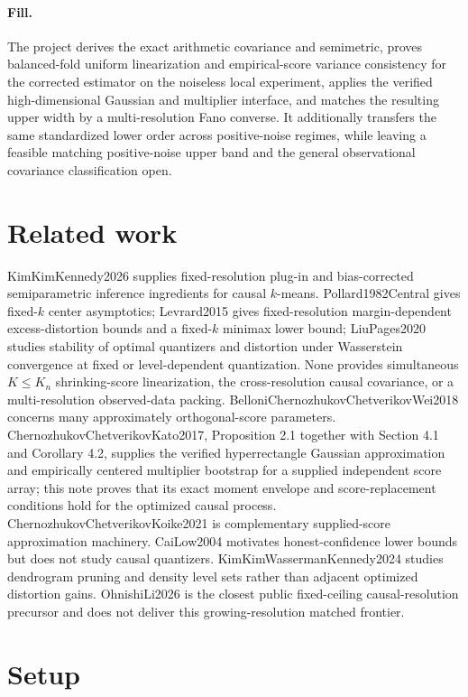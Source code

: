 \documentclass{article}
\begin{document}
\paragraph{Fill.} The project derives the exact arithmetic covariance and semimetric, proves balanced-fold uniform linearization and empirical-score variance consistency for the corrected estimator on the noiseless local experiment, applies the verified high-dimensional Gaussian and multiplier interface, and matches the resulting upper width by a multi-resolution Fano converse. It additionally transfers the same standardized lower order across positive-noise regimes, while leaving a feasible matching positive-noise upper band and the general observational covariance classification open.

\section{Related work}

KimKimKennedy2026 supplies fixed-resolution plug-in and bias-corrected semiparametric inference ingredients for causal \(k\)-means. Pollard1982Central gives fixed-\(k\) center asymptotics; Levrard2015 gives fixed-resolution margin-dependent excess-distortion bounds and a fixed-\(k\) minimax lower bound; LiuPages2020 studies stability of optimal quantizers and distortion under Wasserstein convergence at fixed or level-dependent quantization. None provides simultaneous \(K\leq K_n\) shrinking-score linearization, the cross-resolution causal covariance, or a multi-resolution observed-data packing. BelloniChernozhukovChetverikovWei2018 concerns many approximately orthogonal-score parameters. ChernozhukovChetverikovKato2017, Proposition 2.1 together with Section 4.1 and Corollary 4.2, supplies the verified hyperrectangle Gaussian approximation and empirically centered multiplier bootstrap for a supplied independent score array; this note proves that its exact moment envelope and score-replacement conditions hold for the optimized causal process. ChernozhukovChetverikovKoike2021 is complementary supplied-score approximation machinery. CaiLow2004 motivates honest-confidence lower bounds but does not study causal quantizers. KimKimWassermanKennedy2024 studies dendrogram pruning and density level sets rather than adjacent optimized distortion gains. OhnishiLi2026 is the closest public fixed-ceiling causal-resolution precursor and does not deliver this growing-resolution matched frontier.

\section{Setup}
\end{document}
